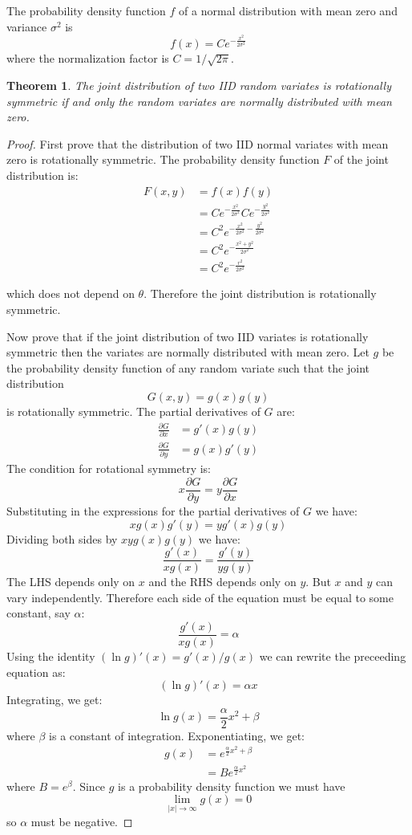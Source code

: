 \documentclass[11pt]{amsart}
\newtheorem{theorem}{Theorem}
\begin{document}
The probability density function $f$ of a normal distribution with mean zero and variance $\sigma^2$ is
$$
f(x) = Ce^{-\frac{x^2}{2\sigma^2}}
$$
where the normalization factor is $C=1/\sqrt{2\pi}$.

\begin{theorem}
The joint distribution of two IID random variates is rotationally symmetric if and only the random variates are normally distributed with mean zero.
\end{theorem}

\begin{proof}

First prove that the distribution of two IID normal variates with mean zero is rotationally symmetric.
The probability density function $F$ of the joint distribution is:
$$
\begin{aligned}
F(x,y)	&= f(x)f(y) \\
		&= Ce^{-\frac{x^2}{2\sigma^2}}Ce^{-\frac{y^2}{2\sigma^2}} \\
		&= C^2e^{-\frac{x^2}{2\sigma^2}-\frac{y^2}{2\sigma^2}} \\
		&= C^2 e^{-\frac{x^2+y^2}{2\sigma^2}} \\
		&= C^2 e^{-\frac{r^2}{2\sigma^2}}
\end{aligned}
$$

which does not depend on $\theta$.
Therefore the joint distribution is rotationally symmetric.

Now prove that if the joint distribution of two IID variates is rotationally symmetric then the variates are normally distributed with mean zero.
Let $g$ be the probability density function of any random variate such that the joint distribution
$$G(x,y) = g(x)g(y)$$ 
is rotationally symmetric.
The partial derivatives of $G$ are:
$$
\begin{aligned}
\frac{\partial G}{\partial x} &= g'(x)g(y) \\
\frac{\partial G}{\partial y} &= g(x)g'(y)
\end{aligned}
$$
The condition for rotational symmetry is:
$$
x\frac{\partial G}{\partial y} = y\frac{\partial G}{\partial x}
$$
Substituting in the expressions for the partial derivatives of $G$ we have:
$$
x g(x)g'(y) = y g'(x)g(y)
$$
Dividing both sides by $x y g(x) g(y)$ we have:
$$
\frac{g'(x)}{x g(x)} = \frac{g'(y)}{y g(y)}
$$
The LHS depends only on $x$ and the RHS depends only on $y$.
But $x$ and $y$ can vary independently.
Therefore each side of the equation must be equal to some constant, say $\alpha$:
$$
\frac{g'(x)}{x g(x)} = \alpha
$$
Using the identity $(\ln g)'(x) = g'(x)/g(x)$ we can rewrite the preceeding equation as:
$$
(\ln g)'(x) = \alpha x
$$
Integrating, we get:
$$
\ln g(x) = \frac{\alpha}{2} x^2 + \beta
$$
where $\beta$ is a constant of integration.
Exponentiating, we get:
$$
\begin{aligned}
g(x) 	&= e^{\frac{\alpha}{2} x^2 + \beta} \\
	&= B e^{\frac{\alpha}{2} x^2}
\end{aligned}
$$
where $B = e^\beta$.
Since $g$ is a probability density function we must have
$$
\lim_{|x|\rightarrow\infty}g(x) = 0
$$
so $\alpha$ must be negative.


\end{proof}
\end{document}
